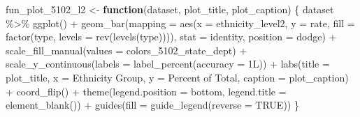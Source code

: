 \documentclass[
]{article}
\newenvironment{Shaded}{\begin{snugshade}}{\end{snugshade}}
\newcommand{\AttributeTok}[1]{\textcolor[rgb]{0.77,0.63,0.00}{#1}}
\newcommand{\ConstantTok}[1]{\textcolor[rgb]{0.00,0.00,0.00}{#1}}
\newcommand{\ControlFlowTok}[1]{\textcolor[rgb]{0.13,0.29,0.53}{\textbf{#1}}}
\newcommand{\FunctionTok}[1]{\textcolor[rgb]{0.00,0.00,0.00}{#1}}
\newcommand{\NormalTok}[1]{#1}
\newcommand{\OtherTok}[1]{\textcolor[rgb]{0.56,0.35,0.01}{#1}}
\newcommand{\SpecialCharTok}[1]{\textcolor[rgb]{0.00,0.00,0.00}{#1}}
\newcommand{\StringTok}[1]{\textcolor[rgb]{0.31,0.60,0.02}{#1}}
\begin{document}
\begin{Shaded}
\begin{Highlighting}[]
\NormalTok{fun\_plot\_5102\_l2 }\OtherTok{\textless{}{-}} \ControlFlowTok{function}\NormalTok{(dataset, plot\_title, plot\_caption) \{}
\NormalTok{    dataset }\SpecialCharTok{\%\textgreater{}\%} 
        \FunctionTok{ggplot}\NormalTok{() }\SpecialCharTok{+}
        \FunctionTok{geom\_bar}\NormalTok{(}\AttributeTok{mapping =} \FunctionTok{aes}\NormalTok{(}\AttributeTok{x =}\NormalTok{ ethnicity\_level2, }
                               \AttributeTok{y =}\NormalTok{ rate, }
                               \AttributeTok{fill =} \FunctionTok{factor}\NormalTok{(type, }\AttributeTok{levels =} \FunctionTok{rev}\NormalTok{(}\FunctionTok{levels}\NormalTok{(type)))), }
                 \AttributeTok{stat =} \StringTok{\textquotesingle{}identity\textquotesingle{}}\NormalTok{, }
                 \AttributeTok{position =} \StringTok{\textquotesingle{}dodge\textquotesingle{}}\NormalTok{) }\SpecialCharTok{+}
        \FunctionTok{scale\_fill\_manual}\NormalTok{(}\AttributeTok{values =}\NormalTok{ colors\_5102\_state\_dept) }\SpecialCharTok{+}
        \FunctionTok{scale\_y\_continuous}\NormalTok{(}\AttributeTok{labels =} \FunctionTok{label\_percent}\NormalTok{(}\AttributeTok{accuracy =}\NormalTok{ 1L)) }\SpecialCharTok{+}
        \FunctionTok{labs}\NormalTok{(}\AttributeTok{title =}\NormalTok{ plot\_title,}
             \AttributeTok{x =} \StringTok{\textquotesingle{}Ethnicity Group\textquotesingle{}}\NormalTok{,}
             \AttributeTok{y =} \StringTok{\textquotesingle{}Percent of Total\textquotesingle{}}\NormalTok{, }
             \AttributeTok{caption =}\NormalTok{ plot\_caption) }\SpecialCharTok{+}
        \FunctionTok{coord\_flip}\NormalTok{() }\SpecialCharTok{+} 
        \FunctionTok{theme}\NormalTok{(}\AttributeTok{legend.position =} \StringTok{\textquotesingle{}bottom\textquotesingle{}}\NormalTok{, }
              \AttributeTok{legend.title =} \FunctionTok{element\_blank}\NormalTok{()) }\SpecialCharTok{+}
        \FunctionTok{guides}\NormalTok{(}\AttributeTok{fill =} \FunctionTok{guide\_legend}\NormalTok{(}\AttributeTok{reverse =} \ConstantTok{TRUE}\NormalTok{))}
\NormalTok{\}}


\end{Highlighting}
\end{Shaded}
\end{document}
